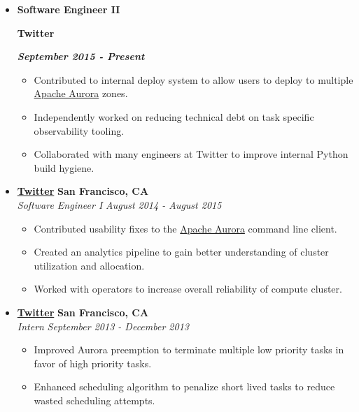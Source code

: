 \documentclass[10pt,letterpaper]{article}
\newcommand\textbox[1]{%
  \parbox{.333\textwidth}{#1}%
}
\begin{document}
  \begin{itemize}[leftmargin=*]
    \parskip=-0.6em
    
    \item[]
    {
      \textbox{\textbf{Software Engineer II}\hfill}\textbox{\hfil \textbf{Twitter}\hfil}\hfill \textbf{\emph{September 2015 - Present}}
    }
    
    \begin{itemize}[label=\textbullet]
      \itemsep0em
      \item Contributed to internal deploy system to allow users to deploy to
      multiple \href{aurora.apache.org}{Apache Aurora} zones.
      \item Independently worked on reducing technical debt on task specific
      observability tooling.
      \item Collaborated with many engineers at Twitter to improve internal
      Python build hygiene.
    \end{itemize}
    
    
    \item[]
    {\href{http://www.twitter.com}{\textbf{Twitter}} \hfill
      \textbf{San Francisco, CA}}
    \\
    {\emph{Software Engineer I} \hfill \emph{August 2014 - August 2015}}
    
    \begin{itemize}[label=\textbullet]
      \itemsep0em
      \item Contributed usability fixes to the
      \href{aurora.apache.org}{Apache Aurora} command line client.
      \item Created an analytics pipeline to gain better understanding of
      cluster utilization and allocation.
      \item Worked with operators to increase overall reliability of compute
      cluster.
    \end{itemize}
    
    \item[]
    {\href{http://www.twitter.com}{\textbf{Twitter}} \hfill
      \textbf{San Francisco, CA}}
    \\
    {\emph{Intern} \hfill \emph{September 2013 - December 2013}}
    
    \begin{itemize}[label=\textbullet]
      \itemsep0em
      \item Improved Aurora preemption to terminate multiple low priority tasks
      in favor of high priority tasks.
      \item Enhanced scheduling algorithm to penalize short lived tasks to
      reduce wasted scheduling attempts.
    \end{itemize}
    

\end{itemize}
\end{document}
